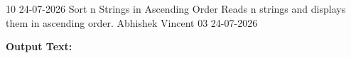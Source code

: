 \clearpage
\label{prog:10}
\programhead
  {10}
  {24-07-2026}
  {Sort n Strings in Ascending Order}
  {Reads n strings and displays them in ascending order.}
  {Abhishek Vincent}
  {03}
  {24-07-2026}

\divider
\textbf{Output Text:}\par
\vspace{2pt}

